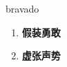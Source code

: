
\begin{frame}
{\huge bravado}
\begin{center}
\begin{enumerate}\Large
  \item \textbf{假装勇敢}
  \item \textbf{虚张声势}
\end{enumerate}
\end{center}
\end{frame}
